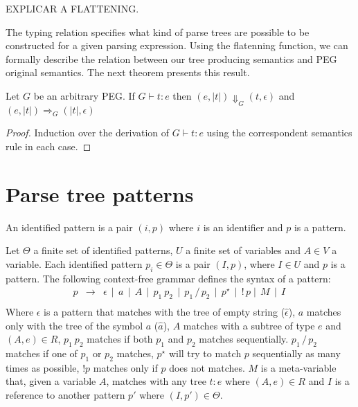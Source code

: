 EXPLICAR A FLATTENING.

The typing relation specifies what kind of parse trees are possible to be
constructed for a given parsing expression. Using the flatenning function,
we can formally describe the relation between our tree producing semantics
and PEG original semantics.
The next theorem presents this result.

\begin{theorem}
  Let $G$ be an arbitrary PEG. If $G \vdash t : e$ then $(e, |t|) \Downarrow_G (t, \epsilon)$ and
  $(e, |t|)\Rightarrow_G (|t|, \epsilon)$
\end{theorem}
\begin{proof}
  Induction over the derivation of $G \vdash t : e$ using the correspondent semantics rule in each case.
\end{proof}



\section{Parse tree patterns}



\begin{definition}
    An identified pattern is a pair \((i, p)\) where \(i\) is an identifier and
    \(p\) is a pattern.
\end{definition}

Let \(\Theta\) a finite set of identified patterns, \(U\) a finite set of
variables and \(A \in V\) a variable.
Each identified pattern \(p_i \in \Theta\) is a pair \((I, p)\), where \(I \in U\)
and \(p\) is a pattern.
The following context-free grammar defines the syntax of a pattern:
\[
    \begin{array}{lcl}
        p & \to & \epsilon \, \mid \, a \, \mid \, A\, \mid \,p_1\:p_2\,
                \mid\,p_1\,/\,p_2\, \mid \,p^\star\, \mid \,!\,p
                \mid \, M\, \mid \, I\,\\
    \end{array}
\]
Where \(\epsilon\) is a pattern that matches with the tree of empty string (\(\hat{\epsilon}\)),
\(a\) matches only with the tree of the symbol \(a\) (\(\hat{a}\)), \(A\) matches
with a subtree of type \(e\) and \((A, e) \in R\), \(p_1\:p_2\) matches if both
\(p_1\) and \(p_2\) matches sequentially. \(p_1\,/\,p_2\) matches if one of \(p_1\)
or \(p_2\) matches, \(p^\star\) will try to match \(p\) sequentially as many times
as possible, \(!p\) matches only if \(p\) does not matches. \(M\) is a meta-variable
that, given a variable \(A\), matches with any tree \(t : e\) where \((A, e) \in R\)
and \(I\) is a reference to another pattern \(p'\) where \((I, p') \in \Theta\).


